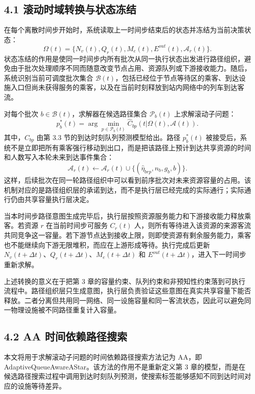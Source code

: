 \documentclass[UTF8,a4paper,12pt]{ctexart}
\begin{document}
\subsection{4.1 滚动时域转换与状态冻结}

在每个离散时间步开始时，系统读取上一时间步结束后的状态并冻结为当前决策状态：
\[
\Omega(t)=\{N_v(t),Q_r(t),M_e(t),E^{out}(t),\mathcal A_r(t)\}.
\]
状态冻结的作用是使同一时间步内所有批次从同一执行状态出发进行路径组织，避免由于批次处理顺序不同而随意改变节点占用、资源队列或下游接收能力。随后，系统识别当前可调度批次集合 \(\mathcal B(t)\)，包括已经位于节点等待区的乘客、到达设施入口但尚未获得服务的乘客，以及在当前时刻释放到站内网络中的列车到达客流。

对每个批次 \(b\in\mathcal B(t)\)，求解器在候选路径集合 \(\mathcal P_b(t)\) 上求解滚动子问题：
\[
p_b^{*}(t)=\arg\min_{p\in\mathcal P_b(t)}
\widehat C_{bp}(t|\Omega(t),\mathcal A(t)).
\]
其中，\(\widehat C_{bp}\) 由第 3.3 节的到达时刻队列预测模型给出。路径 \(p_b^{*}(t)\) 被接受后，系统不是立即把所有乘客强行移动到出口，而是把该路径上预计到达共享资源的时间和人数写入本轮未来到达事件集合：
\[
\mathcal A_r(t)\leftarrow
\mathcal A_r(t)\cup\{(\widehat\eta_{brp},n_b,g_b,b)\}.
\]
这样，后续批次在同一轮路径组织中可以看到前序批次对未来资源容量的占用。该机制对应的是路径组织层的承诺到达，而不是执行层已经完成的实际通行；实际通行仍由共享容量执行层决定。

当本时间步路径意图生成完毕后，执行层按照资源服务能力和下游接收能力释放乘客。若资源 \(r\) 在当前时间步可服务 \(C_r(t)\) 人，则所有等待进入该资源的来源客流共同竞争这一容量。若下游节点达到接收上限，则即使资源有剩余服务能力，乘客也不能继续向下游无限堆积，而应在上游形成等待。执行完成后更新 \(N_v(t+\Delta t)\)、\(Q_r(t+\Delta t)\)、\(M_e(t+\Delta t)\) 和 \(E^{out}(t+\Delta t)\)，进入下一时间步重新求解。

上述转换的意义在于把第 3 章的容量约束、队列约束和非预知性约束落到可执行流程中。路径组织层只生成意图，执行层负责验证这些意图在真实共享容量下能否释放。二者分离但共用同一网络、同一设施容量和同一客流状态，因此可以避免同一物理设施被不同路径重复计入容量。

\subsection{4.2 AA 时间依赖路径搜索}

本文将用于求解滚动子问题的时间依赖路径搜索方法记为 AA，即 AdaptiveQueueAwareAStar。该方法的作用不是重新定义第 3 章的模型，而是在候选路径搜索过程中调用到达时刻队列预测，使搜索标签能够感知不同到达时间对应的设施等待差异。
\end{document}
